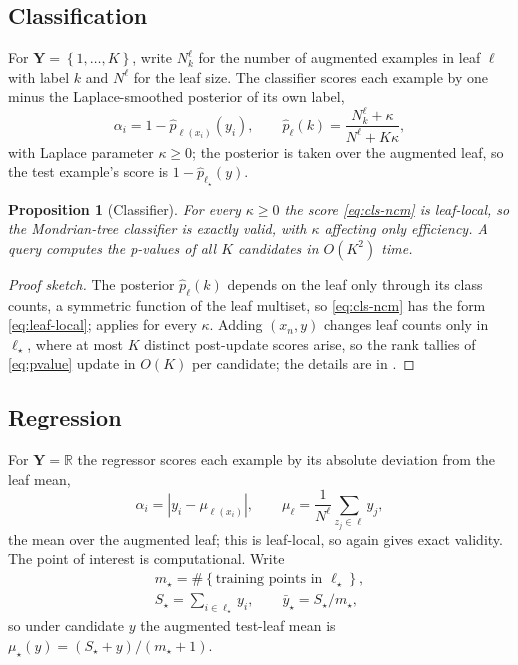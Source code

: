 \documentclass[twoside]{article}
\numberwithin{equation}{section}
\theoremstyle{plain}
\newtheorem{proposition}[theorem]{Proposition}
\theoremstyle{definition}
\theoremstyle{remark}
\newcommand{\set}[1]{\left\{#1\right\}}
\newcommand{\abs}[1]{\left\lvert #1 \right\rvert}
\begin{document}
\subsection{Classification}\label{sec:trees-classification}

For $\mathbf{Y} = \set{1, \dots, K}$, write $N_k^{\ell}$ for the number
of augmented examples in leaf $\ell$ with label $k$ and $N^{\ell}$ for the
leaf size. The classifier scores each example by one minus the Laplace-smoothed
posterior of its own label,
\begin{equation}\label{eq:cls-ncm}
  \alpha_i = 1 - \widehat{p}_{\ell(x_i)}(y_i),
  \qquad
  \widehat{p}_{\ell}(k)
    = \frac{N_k^{\ell} + \kappa}{N^{\ell} + K \kappa},
\end{equation}
with Laplace parameter $\kappa \ge 0$; the posterior is taken over the augmented
leaf, so the test example's score is $1 - \widehat{p}_{\ell_{\star}}(y)$.

\begin{proposition}[Classifier]\label{prop:cls-validity}
For every $\kappa \ge 0$ the score \eqref{eq:cls-ncm} is leaf-local, so the
Mondrian-tree classifier is exactly valid, with $\kappa$ affecting only
efficiency. A query computes the p-values of all $K$ candidates in
$O(K^2)$ time.
\end{proposition}

\begin{proof}[Proof sketch]
The posterior $\widehat{p}_{\ell}(k)$ depends on the leaf only through its class
counts, a symmetric function of the leaf multiset, so \eqref{eq:cls-ncm} has the
form \eqref{eq:leaf-local};  applies for every $\kappa$.
Adding $(x_n, y)$ changes leaf counts only in $\ell_{\star}$, where at most
$K$ distinct post-update scores arise, so the rank tallies of
\eqref{eq:pvalue} update in $O(K)$ per candidate; the details are in
.
\end{proof}

\subsection{Regression}\label{sec:trees-regression}

For $\mathbf{Y} = \mathbb{R}$ the regressor scores each example by its absolute deviation
from the leaf mean,
\begin{equation}\label{eq:reg-ncm}
  \alpha_i = \abs{y_i - \mu_{\ell(x_i)}},
  \qquad
  \mu_{\ell} = \frac{1}{N^{\ell}} \sum_{z_j \in \ell} y_j,
\end{equation}
the mean over the augmented leaf; this is leaf-local, so 
again gives exact validity. The point of interest is computational. Write
\begin{equation}\label{eq:reg-mean}
\begin{gathered}
  m_{\star} = \#\set{\text{training points in } \ell_{\star}}, \\
  S_{\star} = \sum_{i \in \ell_{\star}} y_i,
  \qquad
  \bar{y}_{\star} = S_{\star} / m_{\star},
\end{gathered}
\end{equation}
so under candidate $y$ the augmented test-leaf mean is
$\mu_{\star}(y) = (S_{\star} + y)/(m_{\star} + 1)$.
\end{document}
